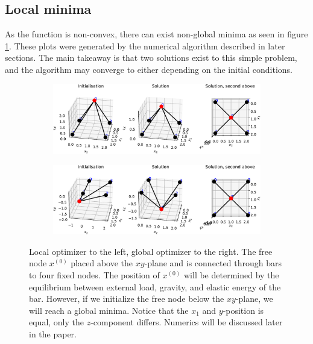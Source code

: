 \subsection{Local minima}
As the function is non-convex, there can exist non-global minima as seen in figure \ref{fig:local_optimizer}. These plots were generated by the numerical algorithm described in later sections. The main takeaway is that two solutions exist to this simple problem, and the algorithm may converge to either depending on the initial conditions. 

\begin{figure}
\centering
\begin{subfigure}{.5\textwidth}
  \centering
  \includegraphics[width=\linewidth]{Bilder/localminpos.pdf}
\end{subfigure}%
\begin{subfigure}{.5\textwidth}
  \centering
  \includegraphics[width=1\linewidth]{Bilder/localminneg.pdf}
\end{subfigure}
\caption{Local optimizer to the left, global optimizer to the right. The free node $x^{(0)}$ placed above the $xy$-plane and is connected through bars to four fixed nodes. The position of $x^{(0)}$ will be determined by the equilibrium between external load, gravity, and elastic energy of the bar. However, if we initialize the free node below the $xy$-plane, we will reach a global minima. Notice that the $x_1$ and $y$-position is equal, only the $z$-component differs. Numerics will be discussed later in the paper. }
\label{fig:local_optimizer}
\end{figure}


